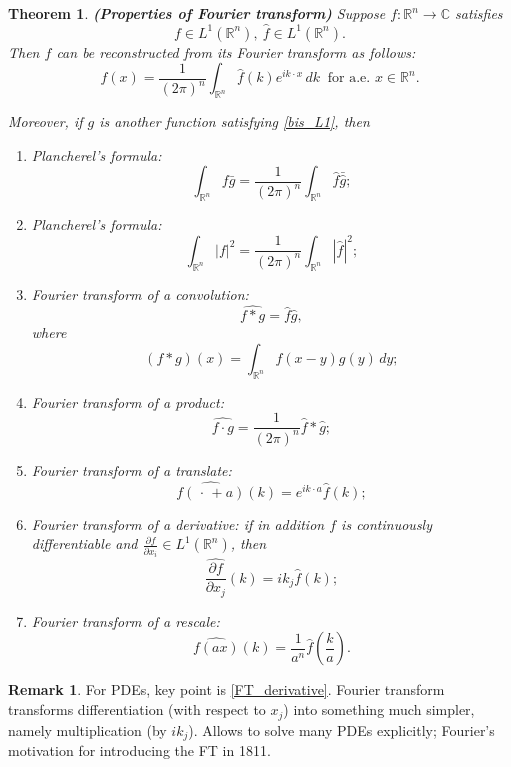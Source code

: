 \documentclass[12pt]{article}
\newtheorem{theorem}{Theorem}[section]
\theoremstyle{definition}
\newtheorem*{remark}{Remark}
\begin{document}
\begin{theorem}\label{properties_FT}
\emph{\textbf{(Properties of Fourier transform)}} Suppose $f:\mathbb R^n\rightarrow\mathbb C$ satisfies
\begin{equation}\tag{$*$}\label{bis_L1}
f\in L^1(\mathbb R^n),\ \hat f\in L^1(\mathbb R^n).
\end{equation}
Then $f$ can be reconstructed from its Fourier transform as follows:
\begin{equation}\tag{R}\label{Fourier_inverse}
f(x)=\frac1{(2\pi)^n}\int_{\mathbb R^n}\hat f(k)e^{ik\cdot x}\,dk\ \text{ for a.e. }x\in\mathbb R^n.
\end{equation}

Moreover, if $g$ is another function satisfying \eqref{bis_L1}, then
\begin{enumerate}[label=\arabic*)]
\item Plancherel's formula:
\[\int_{\mathbb R^n}f\bar g=\frac1{(2\pi)^n}\int_{\mathbb R^n}\hat f\bar{\hat g};\]
\item Plancherel's formula:
\[\int_{\mathbb R^n}|f|^2=\frac1{(2\pi)^n}\int_{\mathbb R^n}|\hat f|^2;\]
\item Fourier transform of a convolution:
\[\widehat{f*g}=\hat f\hat g,\]
where
\[(f*g)(x)=\int_{\mathbb R^n}f(x-y)g(y)\,dy;\]
\item Fourier transform of a product:
\[\widehat{f\cdot g}=\frac1{(2\pi)^n}\hat f*\hat g;\]
\item\label{FT_translate} Fourier transform of a translate:
\[\widehat{f(\,\cdot\,+a)}(k)=e^{ik\cdot a}\hat f(k);\]
\item\label{FT_derivative} Fourier transform of a derivative: if in addition $f$ is continuously differentiable and $\frac{\partial f}{\partial x_i}\in L^1(\mathbb R^n)$, then
\[\widehat{\frac{\partial f}{\partial x_j}}(k)=ik_j\hat f(k);\]
\item Fourier transform of a rescale:
\[\widehat{f(ax)}(k)=\frac1{a^n}\hat f\left(\frac ka\right).\]
\end{enumerate}
\end{theorem}

\begin{remark}
For PDEs, key point is \ref{FT_derivative}. Fourier transform transforms differentiation (with respect to $x_j$) into something much simpler, namely multiplication (by $ik_j$). Allows to solve many PDEs explicitly; Fourier's motivation for introducing the FT in 1811.
\end{remark}
\end{document}
